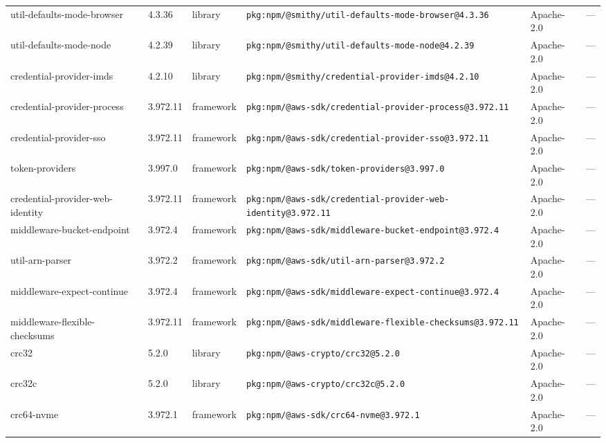 \documentclass[11pt,a4paper]{article}
\begin{document}
\begin{longtable}{|p{4cm}|p{2cm}|p{1.6cm}|p{5cm}|p{1.5cm}|p{3.5cm}|}
\raggedright util-defaults-mode-browser & 4.3.36 & library & \small\texttt{pkg:npm/@smithy/util-defaults-mode-browser@4.3.36} & Apache-2.0 & \small — \\
\raggedright util-defaults-mode-node & 4.2.39 & library & \small\texttt{pkg:npm/@smithy/util-defaults-mode-node@4.2.39} & Apache-2.0 & \small — \\
\raggedright credential-provider-imds & 4.2.10 & library & \small\texttt{pkg:npm/@smithy/credential-provider-imds@4.2.10} & Apache-2.0 & \small — \\
\raggedright credential-provider-process & 3.972.11 & framework & \small\texttt{pkg:npm/@aws-sdk/credential-provider-process@3.972.11} & Apache-2.0 & \small — \\
\raggedright credential-provider-sso & 3.972.11 & framework & \small\texttt{pkg:npm/@aws-sdk/credential-provider-sso@3.972.11} & Apache-2.0 & \small — \\
\raggedright token-providers & 3.997.0 & framework & \small\texttt{pkg:npm/@aws-sdk/token-providers@3.997.0} & Apache-2.0 & \small — \\
\raggedright credential-provider-web-identity & 3.972.11 & framework & \small\texttt{pkg:npm/@aws-sdk/credential-provider-web-identity@3.972.11} & Apache-2.0 & \small — \\
\raggedright middleware-bucket-endpoint & 3.972.4 & framework & \small\texttt{pkg:npm/@aws-sdk/middleware-bucket-endpoint@3.972.4} & Apache-2.0 & \small — \\
\raggedright util-arn-parser & 3.972.2 & framework & \small\texttt{pkg:npm/@aws-sdk/util-arn-parser@3.972.2} & Apache-2.0 & \small — \\
\raggedright middleware-expect-continue & 3.972.4 & framework & \small\texttt{pkg:npm/@aws-sdk/middleware-expect-continue@3.972.4} & Apache-2.0 & \small — \\
\raggedright middleware-flexible-checksums & 3.972.11 & framework & \small\texttt{pkg:npm/@aws-sdk/middleware-flexible-checksums@3.972.11} & Apache-2.0 & \small — \\
\raggedright crc32 & 5.2.0 & library & \small\texttt{pkg:npm/@aws-crypto/crc32@5.2.0} & Apache-2.0 & \small — \\
\raggedright crc32c & 5.2.0 & library & \small\texttt{pkg:npm/@aws-crypto/crc32c@5.2.0} & Apache-2.0 & \small — \\
\raggedright crc64-nvme & 3.972.1 & framework & \small\texttt{pkg:npm/@aws-sdk/crc64-nvme@3.972.1} & Apache-2.0 & \small — \\

\end{longtable}
\end{document}
